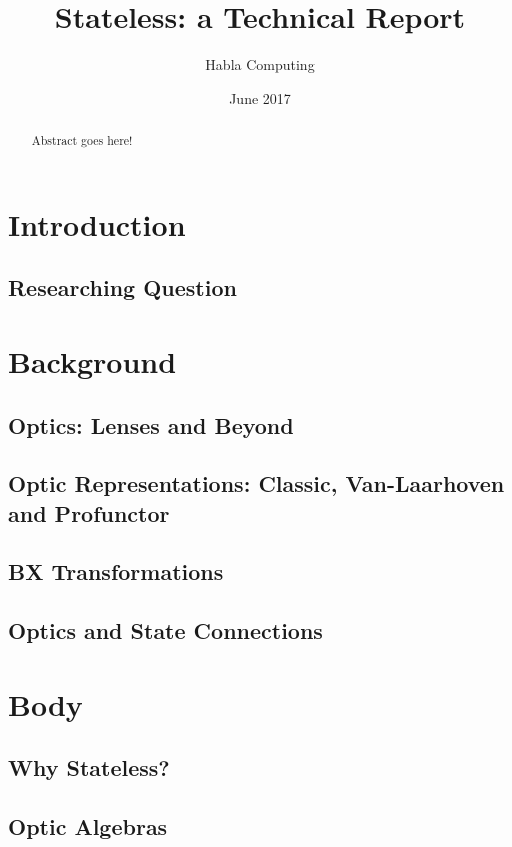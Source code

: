\documentclass{report}
\begin{document}
\title{Stateless: a Technical Report}
\author{Habla Computing}
\date{June 2017}

\maketitle

\begin{abstract}

  Abstract goes here!

\end{abstract}

\tableofcontents

\chapter{Introduction}
\section{Researching Question}

\chapter{Background}
\section{Optics: Lenses and Beyond}
\section{Optic Representations: Classic, Van-Laarhoven and Profunctor}
\section{BX Transformations}
\section{Optics and State Connections}

\chapter{Body}
\section{Why Stateless?}
\section{Optic Algebras}
\end{document}
